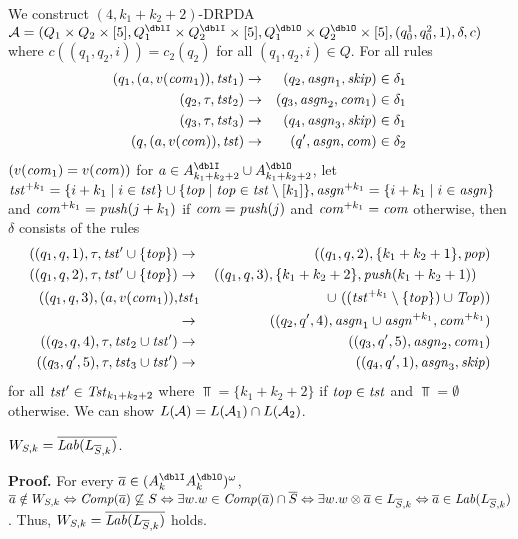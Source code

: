 We construct $(4,k_1+k_2+2)$-DRPDA
$\calA=(Q_1\times Q_2\times[5], Q^\dblI_1\times Q^\dblI_2\times[5], Q^\dblO_1\times Q^\dblO_2\times[5], (q^1_0, q^2_0, 1), \delta, c)$
where $c((q_1,q_2,i))=c_2(q_2)$ for all $(q_1,q_2,i)\in Q$.
For all rules
\begin{eqnarray}
(q_1, (a,v(\mathit{com}_1)), \mathit{tst}_1) &\to & (q_2,\mathit{asgn}_1, \mathit{skip})\in\delta_1\label{eq: LkS1}\\
(q_2, \tau, \mathit{tst}_2) &\to & (q_3,\mathit{asgn}_2, \mathit{com}_1)\in\delta_1\label{eq: LkS2}\\
(q_3, \tau, \mathit{tst}_3) &\to & (q_4,\mathit{asgn}_3, \mathit{skip})\in\delta_1\label{eq: LkS3}\\
(q, (a,v(\mathit{com})), \mathit{tst}) &\to & (q',\mathit{asgn}, \mathit{com})\in\delta_2\label{eq: LkS4}
\end{eqnarray}
$(v(\mathit{com}_1)=v(\mathit{com}))$ for $a\in A^\dblI_{k_1+k_2+2}\cup A^\dblO_{k_1+k_2+2}$,
let $\mathit{tst}^{+ k_1}=\{i+k_1\mid i\in\mathit{tst}\}\cup\{\mathit{top}\mid\mathit{top}\in\mathit{tst}\setminus[k_1]\}, \mathit{asgn}^{+ k_1}=\{i+k_1\mid i\in\mathit{asgn}\}$ and $\mathit{com}^{+ k_1} = \mathit{push}(j+k_1)$ if $\mathit{com}=\mathit{push}(j)$ and $\mathit{com}^{+ k_1} = \mathit{com}$ otherwise, then $\delta$ consists of the rules
\begin{eqnarray}
((q_1, q, 1), \tau, \mathit{tst}'\cup\{\mathit{top}\}) &\to & ((q_1, q, 2), \{k_1+k_2+1\}, \mathit{pop})\label{eq: LkS5}\\
((q_1, q, 2), \tau, \mathit{tst}'\cup\{\mathit{top}\}) &\to & ((q_1, q, 3), \{k_1+k_2+2\}, \mathit{push}(k_1+k_2+1)) \quad\label{eq: LkS6}\\
((q_1, q, 3), (a,v(\mathit{com}_1)),
&\mathit{tst}_1 &\cup\ ((\mathit{tst}^{+ k_1}\setminus\{\mathit{top}\})\cup\mathit{Top})) \nonumber\\
 &\to & ((q_2, q', 4), \mathit{asgn}_1\cup\mathit{asgn}^{+ k_1}, \mathit{com}^{+ k_1})\label{eq: LkS7}\\
((q_2, q, 4), \tau, \mathit{tst}_2\cup\mathit{tst}') &\to & ((q_3, q', 5), \mathit{asgn}_2, \mathit{com}_1)\label{eq: LkS8}\\
((q_3, q', 5), \tau, \mathit{tst}_3\cup\mathit{tst}') &\to & ((q_4, q', 1), \mathit{asgn}_3, \mathit{skip})\label{eq: LkS9}
\end{eqnarray}
for all $\mathit{tst}'\in\mathit{Tst}_{k_1+k_2+2}$ where
$\Top=\{k_1+k_2+2\}$ if $\mathit{top}\in\mathit{tst}$ and $\Top=\emptyset$ otherwise.
We can show $L({\cal A})=L({\cal A}_1)\cap L({\cal A}_2)$.

\begin{lemma}  \label{lem: W=lab}
$W_{S,k} = \overline{\mathit{Lab}(L_{{\overline{S}},k})}$.
\end{lemma}
{\bf Proof.}\quad
For every $\overa\in(A_k^\dblI A_k^\dblO)^\omega$,
${\overline{a}}\notin W_{S,k} \Leftrightarrow {\mathit{Comp}}({\overline{a}})\not\subseteq S
\Leftrightarrow \exists w. w\in {\mathit{Comp}}({\overline{a}})\cap {\overline{S}}
\Leftrightarrow \exists w. w\otimes{\overline{a}}\in L_{{\overline{S}},k}
\Leftrightarrow {\overline{a}}\in\mathit{Lab}(L_{{\overline{S}},k})$.
Thus, $W_{S,k} = \overline{\mathit{Lab}(L_{{\overline{S}},k})}$ holds.

